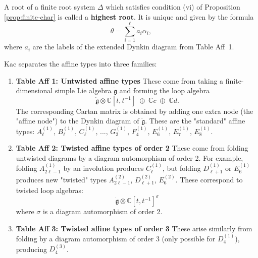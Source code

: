 \documentclass[12pt]{article}
\begin{document}
\begin{remark}
    A root of a finite root system $\Delta$ which satisfies condition (vi) of
    Proposition \ref{prop:finite-char} is called a \textbf{highest root}. It is unique and given by
    the formula
    \[
        \theta = \sum_{i=1}^\ell a_i \alpha_i,
    \]
    where $a_i$ are the labels of the extended Dynkin diagram from Table Aff~1.
\end{remark}



\begin{remark}
    Kac separates the affine types into three families:
    \begin{enumerate}
        \item \textbf{Table Aff 1: Untwisted affine types}
              These come from taking a finite-dimensional simple Lie algebra $\dot{\mathfrak{g}}$ and forming the loop algebra
              $$\dot{\mathfrak{g}}\otimes \mathbb{C}[t,t^{-1}] \;\oplus\; \mathbb{C}c \;\oplus\; \mathbb{C}d.$$
              The corresponding Cartan matrix is obtained by adding one extra node (the "affine node") to the Dynkin diagram of $\dot{\mathfrak{g}}$.
              These are the "standard" affine types: $A_\ell^{(1)}$, $B_\ell^{(1)}$, $C_\ell^{(1)}$, ..., $G_2^{(1)}$, $F_4^{(1)}$, $E_6^{(1)}$, $E_7^{(1)}$, $E_8^{(1)}$.

        \item \textbf{Table Aff 2: Twisted affine types of order 2}
              These come from folding untwisted diagrams by a diagram automorphism of order 2.
              For example, folding $A_{2\ell-1}^{(1)}$ by an involution produces $C_\ell^{(1)}$, but folding $D_{\ell+1}^{(1)}$ or $E_6^{(1)}$ produces new "twisted" types $A_{2\ell-1}^{(2)}$, $D_{\ell+1}^{(2)}$, $E_6^{(2)}$.
              These correspond to twisted loop algebras:
              $$\dot{\mathfrak{g}}\otimes \mathbb{C}[t,t^{-1}]^\sigma$$
              where $\sigma$ is a diagram automorphism of order 2.

        \item \textbf{Table Aff 3: Twisted affine types of order 3}
              These arise similarly from folding by a diagram automorphism of order 3 (only possible for $D_4^{(1)}$), producing $D_4^{(3)}$.
    \end{enumerate}
\end{remark}
\end{document}

